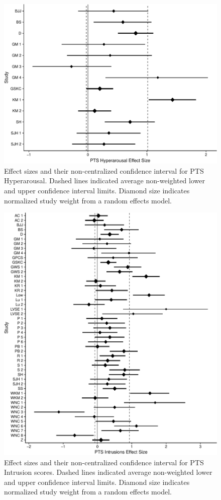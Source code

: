 \documentclass[man, mask]{apa6}
\theoremstyle{definition}
\theoremstyle{definition}
\theoremstyle{definition}
\theoremstyle{remark}
\begin{document}
\begin{figure}[htbp]
\centering
\includegraphics{meta_markdown_files/figure-latex/ptspichyper-1.pdf}
\caption{\label{fig:ptspichyper}Effect sizes and their non-centralized
confidence interval for PTS Hyperarousal. Dashed lines indicated average
non-weighted lower and upper confidence interval limits. Diamond size
indicates normalized study weight from a random effects model.}
\end{figure}

\begin{figure}[htbp]
\centering
\includegraphics{meta_markdown_files/figure-latex/ptspicint-1.pdf}
\caption{\label{fig:ptspicint}Effect sizes and their non-centralized
confidence interval for PTS Intrusion scores. Dashed lines indicated
average non-weighted lower and upper confidence interval limits. Diamond
size indicates normalized study weight from a random effects model.}
\end{figure}
\end{document}
